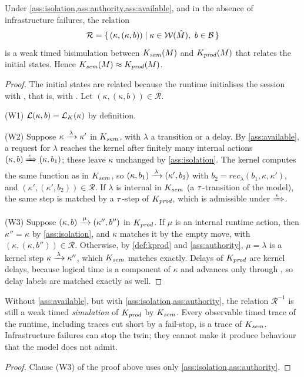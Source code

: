 \begin{theorem}\label{thm:production}
Under \cref{ass:isolation,ass:authority,ass:available}, and in the absence of
infrastructure failures, the relation
\[
  \mathcal{R}=\{\,(\kappa,(\kappa,b))\mid \kappa\in\mathcal{W}(\hat M),\ b\in\mathcal{B}\,\}
\]
is a weak timed bisimulation between $K_{\mathit{sem}}(M)$ and $K_{\mathit{prod}}(M)$ that relates
the initial states. Hence $K_{\mathit{sem}}(M)\approx K_{\mathit{prod}}(M)$.
\end{theorem}
\begin{proof}
The initial states are related because the runtime initialises the session
with , that is, with .
Let $(\kappa,(\kappa,b))\in\mathcal{R}$.

(W1) $\mathcal{L}(\kappa,b)=\mathcal{L}_K(\kappa)$ by definition.

(W2) Suppose $\kappa\xrightarrow{\,\lambda\,}\kappa'$ in $K_{\mathit{sem}}$, with $\lambda$ a transition or a
delay. By \cref{ass:available}, a request for $\lambda$ reaches the kernel after
finitely many internal actions $(\kappa,b)\xRightarrow{\,\epsilon\,}(\kappa,b_1)$; these leave
$\kappa$ unchanged by \cref{ass:isolation}. The kernel computes the same function
as in $K_{\mathit{sem}}$, so $(\kappa,b_1)\xrightarrow{\,\lambda\,}(\kappa',b_2)$ with
$b_2=\mathit{rec}_\lambda(b_1,\kappa,\kappa')$, and $(\kappa',(\kappa',b_2))\in\mathcal{R}$.
If $\lambda$ is internal in $K_{\mathit{sem}}$ (a $\tau$-transition of the model), the same
step is matched by a $\tau$-step of $K_{\mathit{prod}}$, which is admissible under
$\xRightarrow{\,\epsilon\,}$.

(W3) Suppose $(\kappa,b)\xrightarrow{\,\mu\,}(\kappa'',b'')$ in $K_{\mathit{prod}}$. If $\mu$ is an internal
runtime action, then $\kappa''=\kappa$ by \cref{ass:isolation}, and $\kappa$ matches it
by the empty move, with $(\kappa,(\kappa,b''))\in\mathcal{R}$. Otherwise, by
\cref{def:kprod} and \cref{ass:authority}, $\mu=\lambda$ is a kernel step
$\kappa\xrightarrow{\,\lambda\,}\kappa''$, which $K_{\mathit{sem}}$ matches exactly. Delays of $K_{\mathit{prod}}$ are
kernel delays, because logical time is a component of $\kappa$ and advances only
through , so delay labels are matched exactly as well.
\end{proof}

\begin{corollary}\label{cor:failstop}
Without \cref{ass:available}, but with \cref{ass:isolation,ass:authority}, the
relation $\mathcal{R}^{-1}$ is still a weak timed \emph{simulation} of $K_{\mathit{prod}}$ by
$K_{\mathit{sem}}$. Every observable timed trace of the runtime, including traces cut short
by a fail-stop, is a trace of $K_{\mathit{sem}}$. Infrastructure failures can stop the twin;
they cannot make it produce behaviour that the model does not admit.
\end{corollary}
\begin{proof}
Clause (W3) of the proof above uses only \cref{ass:isolation,ass:authority}.
\end{proof}

